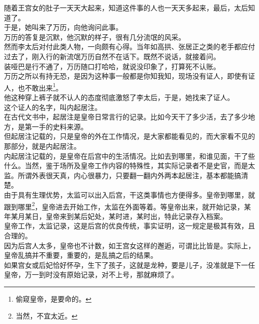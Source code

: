 \begin{multicols}{\theparacolNo}
随着王宫女的肚子一天天大起来，知道这件事的人也一天天多起来，最后，太后知道了。\\

于是，她叫来了万历，向他询问此事。\\

万历的答复是沉默，他沉默的样子，很有几分流氓的风采。\\

然而李太后对付此类人物，一向颇有心得。当年如高拱、张居正之类的老手都应付过去了，刚入行的新流氓万历自然不在话下。既然不说话，就接着问。\\

装哑巴是行不通了，万历随口打哈哈，就说没印象了，打算死不认账。\\

万历之所以有持无恐，是因为这种事一般都是你知我知，现场没有证人，即使有证人，也不敢出来\footnote{偷窥皇帝，是要命的。}。\\

他这种穿上裤子就不认人的态度彻底激怒了李太后，于是，她找来了证人。\\

这个证人的名字，叫内起居注。\\

在古代文书中，起居注是皇帝日常言行的记录。比如今天干了多少活，去了多少地方，是第一手的史料来源。\\

但起居注记载的，只是皇帝的外在工作情况，是大家都能看见的，而大家看不见的那部分，就是内起居注。\\

内起居注记载的，是皇帝在后宫中的生活情况。比如去到哪里，和谁见面，干了些什么。当然，鉴于场所及皇帝工作内容的特殊性，其实际记录者不是史官，而是太监。所谓外表很天真，内心很暴力，只要翻一翻内外两本起居注，基本都能搞清楚。\\

由于具有生理优势，太监可以出入后宫，干这类事情也方便得多。皇帝到哪里，就跟到哪里\footnote{当然，不宜太近。}，皇帝进去开始工作，太监在外面等着。等皇帝出来，就开始记录，某年某月某日，皇帝来到某后妃处，某时进，某时出，特此记录存入档案。\\

皇帝工作，太监记录，这是后宫的优良传统，事实证明，这一规定是极其有效，且合理的。\\

因为后宫人太多，皇帝也不计数，如王宫女这样的邂逅，可谓比比皆是。实际上，皇帝乱搞并不重要，重要的，是乱搞之后的结果。\\

如果宫女或后妃恰好怀孕，生下了孩子，这就是龙种，要是儿子，没准就是下一任皇帝，万一到时没有原始记录，对不上号，那就麻烦了。\\


\end{multicols}
